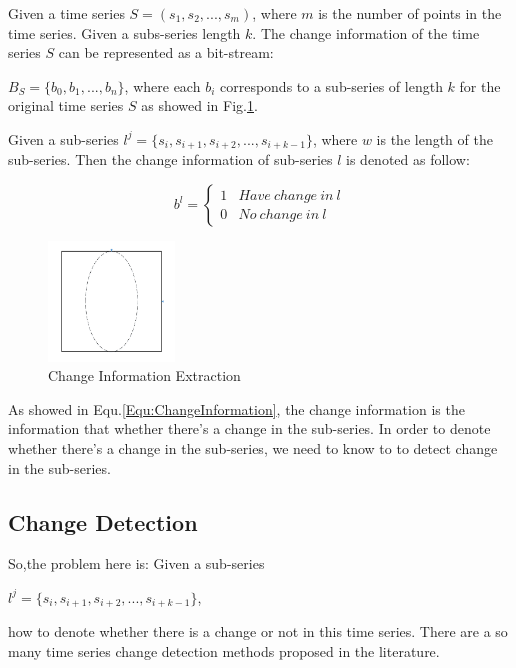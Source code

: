 Given a time series $S = (s_1,s_2,...,s_m)$, where $m$ is the number of points in the time series. Given a subs-series length $k$. The change information of the time series $S$ can be represented as a bit-stream:

$B_S = \{b_0,b_1,...,b_n\}$, where each $b_i$ corresponds to a sub-series of length $k$ for the original time series $S$ as showed in Fig.\ref{ChangeMapping}.

Given a sub-series $l^j = \{s_i,s_{i+1},s_{i+2},...,s_{i+k-1}\}$, where $w$ is the length of the sub-series. Then the change information of sub-series $l$ is denoted as follow:

\begin{equation}
\label{Equ:ChangeInformation}
b^l = \left\{\begin{matrix}
1 & Have~change~in~l
\\ 
0 & No~change~in~l
\end{matrix}\right.
\end{equation}

\begin{figure}[t]
\centering
\includegraphics[width=0.3\textwidth]{temp.pdf}
\caption{Change Information Extraction}
\label{ChangeMapping}
\end{figure}

As showed in Equ.\ref{Equ:ChangeInformation}, the change information is the information that whether there's a change in the sub-series. In order to denote whether there's a change in the sub-series, we need to know to to detect change in the sub-series.

\subsection{Change Detection}

So,the problem here is:
Given a sub-series 

$l^j = \{s_i,s_{i+1},s_{i+2},...,s_{i+k-1}\}$, 

how to denote whether there is a change or not in this time series.
There are a so many time series change detection methods \cite{liu2013change,chen2013contextual} proposed in the literature. 

